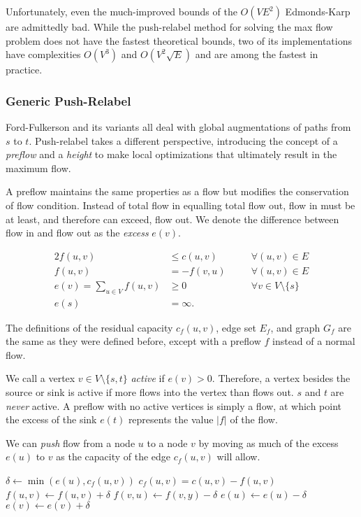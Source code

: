 Unfortunately, even the much-improved bounds of the $O(VE^2)$ Edmonds-Karp are admittedly bad. While the push-relabel method for solving the max flow problem does not have the fastest theoretical bounds, two of its implementations have complexities $O(V^3)$ and $O(V^2\sqrt{E})$ and are among the fastest in practice.

\subsubsection{Generic Push-Relabel}

Ford-Fulkerson and its variants all deal with global augmentations of paths from $s$ to $t$. Push-relabel takes a different perspective, introducing the concept of a \textit{preflow} and a \textit{height} to make local optimizations that ultimately result in the maximum flow.

A preflow maintains the same properties as a flow but modifies the conservation of flow condition. Instead of total flow in equalling total flow out, flow in must be at least, and therefore can exceed, flow out. We denote the difference between flow in and flow out as the \textit{excess} $e(v)$.

\begin{alignat*}{2}
f(u,v) &\le c(u,v)   \quad && \forall (u,v) \in E \\
f(u,v) &= -f(v,u)   \quad && \forall (u,v) \in E \\
e(v) = \sum_{u \in V} f(u,v) &\ge 0   \quad && \forall v \in V \setminus \{s\} \\
e(s) &= \infty. \quad &&
\end{alignat*}

The definitions of the residual capacity $c_f(u,v)$, edge set $E_f$, and graph $G_f$ are the same as they were defined before, except with a preflow $f$ instead of a normal flow.

We call a vertex $v \in V \setminus \{s, t\}$ \textit{active} if $e(v) > 0$. Therefore, a vertex besides the source or sink is active if more flows into the vertex than flows out. $s$ and $t$ are \textit{never} active. A preflow with no active vertices is simply a flow, at which point the excess of the sink $e(t)$ represents the value $|f|$ of the flow.

We can \textit{push} flow from a node $u$ to a node $v$ by moving as much of the excess $e(u)$ to $v$ as the capacity of the edge $c_f(u,v)$ will allow.

\noindent \begin{minipage}{\textwidth}
\begin{algorithmic}
	\State $\delta \gets \min(e(u), c_f(u,v))$
	\Comment $c_f(u,v) = c(u,v) - f(u,v)$
	\State $f(u,v) \gets f(u,v) + \delta$
	\State $f(v,u) \gets f(v,y) - \delta$
	\State $e(u) \gets e(u) - \delta$
	\State $e(v) \gets e(v) + \delta$
\EndFunction
\end{algorithmic}
\end{minipage}

